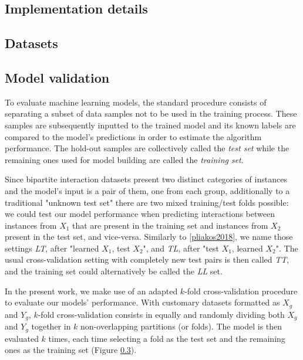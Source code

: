 \documentclass[conference]{IEEEtran}
\begin{document}

\algBuildTree
\algPredict
\algFindBestSplit
\algFindRandomSplit
\algFindBipartiteSplit


\subsection{Implementation details}

\subsection{Datasets}

\subsection{Model validation}  %


To evaluate machine learning models, the standard procedure consists of separating a subset of data samples not to be used in the training process. These samples are subsequently inputted to the trained model and its known labels are compared to the model's predictions in order to estimate the algorithm performance. The hold-out samples are collectively called the \emph{test set} while the remaining ones used for model building are called the \emph{training set}.

Since bipartite interaction datasets present two distinct categories of instances and the model's input is a pair of them, one from each group, additionally to a traditional "unknown test set" there are two mixed training/test folds possible: we could test our model performance when predicting interactions between instances from $X_1$ that are present in the training set and instances from $X_2$ present in the test set, and vice-versa. Similarly to \ref{pliakos2018}, %
we name those settings \emph{LT}, after "learned $X_1$, test $X_2$", and \emph{TL}, after "test $X_1$, learned $X_2$". The usual cross-validation setting with completely new test pairs is then called \emph{TT}, and the training set could alternatively be called the \emph{LL} set.

In the present work, we make use of an adapted $k$-fold cross-validation procedure to evaluate our models' performance. With customary datasets formatted as $X_g$ and $Y_g$, $k$-fold cross-validation consists in equally and randomly dividing both $X_g$ and $Y_g$ together in $k$ non-overlapping partitions (or folds). The model is then evaluated $k$ times, each time selecting a fold as the test set and the remaining ones as the training set (Figure \ref{}).
\end{document}
